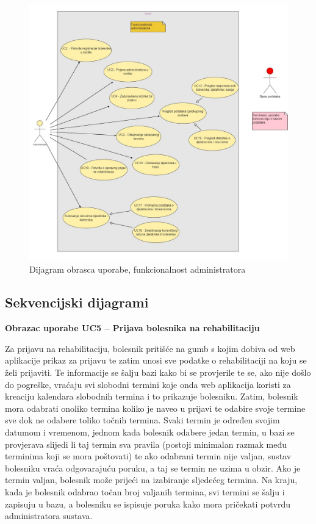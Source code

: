 \begin{figure}[bp]
    \centering
    \includegraphics[width=\textwidth]{./slike/UC Dijagram - Administrator} 
    \caption{Dijagram obrasca uporabe, funkcionalnost administratora}
    \label{fig:my_image}
\end{figure}
\eject

\subsection{Sekvencijski dijagrami}




\textbf{Obrazac uporabe UC5 – Prijava bolesnika na rehabilitaciju}

Za prijavu na rehabilitaciju, bolesnik pritišće na gumb s kojim dobiva od web aplikacije prikaz za prijavu te zatim unosi sve podatke o rehabilitaciji na koju se želi prijaviti. Te informacije se šalju bazi kako bi se provjerile te se, ako nije došlo do pogreške, vraćaju svi slobodni termini koje onda web aplikacija koristi za kreaciju kalendara slobodnih termina i to prikazuje bolesniku. Zatim, bolesnik mora odabrati onoliko termina koliko je naveo u prijavi te odabire svoje termine sve dok ne odabere toliko točnih termina. Svaki termin je određen svojim datumom i vremenom, jednom kada bolesnik odabere jedan termin, u bazi se provjerava slijedi li taj termin sva pravila (postoji minimalan razmak među terminima koji se mora poštovati) te ako odabrani termin nije valjan, sustav bolesniku vraća odgovarajuću poruku, a taj se termin ne uzima u obzir. Ako je termin valjan, bolesnik može prijeći na izabiranje sljedećeg termina. Na kraju, kada je bolesnik odabrao točan broj valjanih termina, svi termini se šalju i zapisuju u bazu, a bolesniku se ispisuje poruka kako mora pričekati potvrdu administratora sustava.

